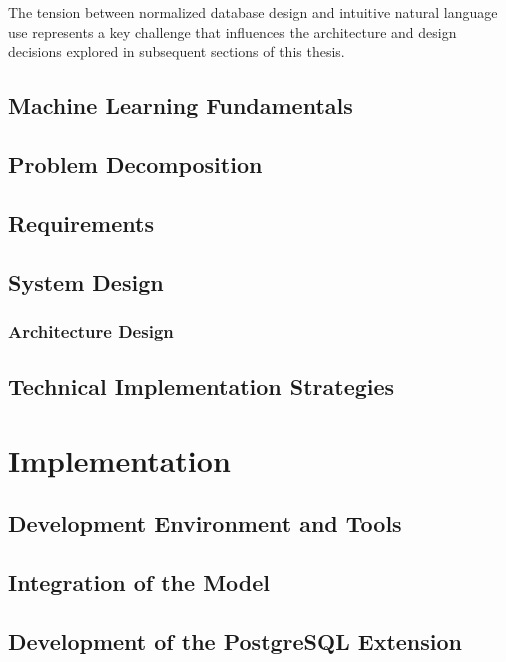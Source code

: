 \documentclass{article}
\begin{document}
The tension between normalized database design and intuitive natural language use represents a key challenge that influences
the architecture and design decisions explored in subsequent sections of this thesis.

\subsection{Machine Learning Fundamentals}






\subsection{Problem Decomposition}

\subsection{Requirements}

\subsection{System Design}

\subsubsection{Architecture Design}

\subsection{Technical Implementation Strategies}

\newpage

\section{Implementation}

\subsection{Development Environment and Tools}

\subsection{Integration of the Model}


\subsection{Development of the PostgreSQL Extension}
\end{document}

